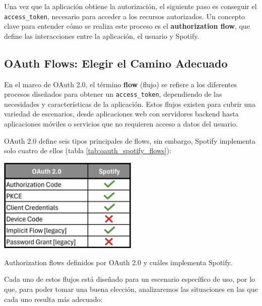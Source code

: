 Una vez que la aplicación obtiene la autorización, el siguiente paso es conseguir el \texttt{access\_token}, necesario para acceder a los recursos autorizados. Un concepto clave para entender cómo se realiza este proceso es el \textbf{authorization flow}, que define las interacciones entre la aplicación, el usuario y Spotify.

\subsection*{OAuth Flows: Elegir el Camino Adecuado}

En el marco de OAuth 2.0, el término \textbf{flow} (flujo) se refiere a los diferentes procesos diseñados para obtener un \texttt{access\_token}, dependiendo de las necesidades y características de la aplicación. Estos flujos existen para cubrir una variedad de escenarios, desde aplicaciones web con servidores backend hasta aplicaciones móviles o servicios que no requieren acceso a datos del usuario.

OAuth 2.0 define seis tipos principales de flows, sin embargo, Spotify implementa solo cuatro de ellos (tabla \ref{tab:oauth_spotify_flows}):

\begin{table}[H]
    \centering
    \includegraphics[width=0.5\textwidth]{figures/oauth_vs_spotify_flows.png}
    \caption{Authorization flows definidos por OAuth 2.0 y cuáles implementa Spotify.}
    \label{tab:oauth_spotify_flows}
\end{table}

Cada uno de estos flujos está diseñado para un escenario específico de uso, por lo que, para poder tomar una buena elección, analizaremos las situaciones en las que cada uno resulta más adecuado:

